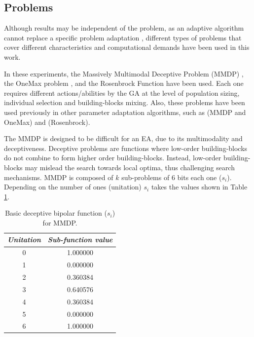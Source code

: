 \documentclass[final,1p,times]{elsarticle}
\begin{document}
\subsection{Problems}


Although results may be independent of the problem, as an adaptive algorithm cannot replace a specific problem adaptation \cite{PanaceasClune05}, different types of problems that cover different characteristics
and computational demands have been used in this work.

In these experiments, the Massively Multimodal Deceptive
Problem (MMDP) \cite{goldberg92massive},  the OneMax problem
\cite{ONEMAX}, and the Rosenbrock Function \cite{CEC2005_Benchmark} have been used. Each one requires different actions/abilities by the GA
at the level of population sizing, individual selection and
building-blocks mixing. Also, these problems have been used previously in other parameter adaptation algorithms, such as \cite{ParallelGATongchim02} (MMDP and OneMax) and \cite{DifferentialWeber09,AdaptationSizesSchlierkamp96} (Rosenbrock). 



The MMDP
 is designed to be difficult for an EA, due to
its multimodality and deceptiveness. Deceptive problems are functions where low-order building-blocks do not combine to form higher order building-blocks. Instead, low-order building-blocks may mislead the search towards local optima, thus challenging search mechanisms. MMDP is composed of $k$ sub-problems of 6 bits each one ($s_i$). Depending on
the number of ones (unitation) $s_i$ takes the values shown in Table \ref{table:mmdpvalues}.  

\begin{table}

\centering
{\footnotesize 
\caption{ Basic deceptive bipolar function ($s_i$) for MMDP.}
\label{table:mmdpvalues}
\begin{tabular}{|c|c|}
\hline
{\em Unitation} & {\em Sub-function value}\\
\hline \hline
0 & 1.000000 \\
\hline
1 & 0.000000 \\
\hline
2 & 0.360384 \\
\hline
3 & 0.640576\\
\hline
4 & 0.360384\\
\hline
5 & 0.000000\\
\hline
6 & 1.000000\\
\hline

\end{tabular}
}


\end{table}
\end{document}
